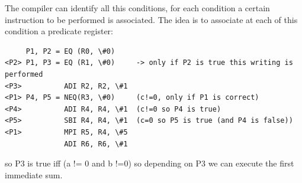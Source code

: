 The compiler can identify all this conditions, for each condition a certain
instruction to be performed is associated. The idea is to associate at each of
this condition a predicate register:
\begin{verbatim}
     P1, P2 = EQ (R0, \#0)
<P2> P1, P3 = EQ (R1, \#0)     -> only if P2 is true this writing is performed
<P3>          ADI R2, R2, \#1
<P1> P4, P5 = NEQ(R3, \#0)     (c!=0, only if P1 is correct)
<P4>          ADI R4, R4, \#1  (c!=0 so P4 is true)
<P5>          SBI R4, R4, \#1  (c=0 so P5 is true (and P4 is false))
<P1>          MPI R5, R4, \#5
              ADI R6, R6, \#1
\end{verbatim}
so P3 is true iff (a != 0 and b !=0) so depending on P3 we can execute the
first immediate sum.

